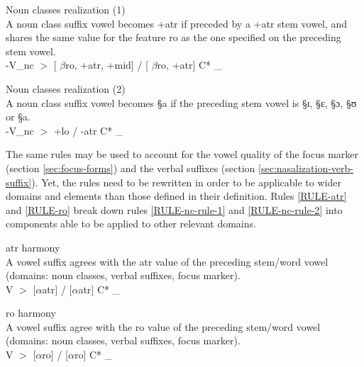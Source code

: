 \begin{Rule}\label{RULE-nc-rule-1}{Noun classes realization (1)}\\
A noun class suffix vowel becomes {\sc +atr} if preceded by a {\sc +atr}
stem vowel, and shares the same value for the
feature {\sc ro}  as the one specified on the preceding stem vowel. \\
-V_{nc} $>$ [ $\beta${\sc ro},  {\sc +atr}, {\sc +mid}]  / [ $\beta${\sc ro},
{\sc +atr}] C* \_

\end{Rule}


\begin{Rule}\label{RULE-nc-rule-2}{Noun classes realization (2)}\\
A noun class suffix vowel becomes {\S a} if the preceding stem vowel is 
{\S ɪ},
{\S ɛ}, {\S ɔ}, {\S ʊ} or {\S a}.\\
-V_{nc} $>$ {\sc +lo}  / {\sc -atr} C* \_ 
\end{Rule}


The same rules may be used to account for the vowel
quality of the focus marker (section \ref{sec:focus-forms}) and  the verbal
suffixes (section \ref{sec:nasalization-verb-suffix}). Yet, the rules need to
be rewritten in order to be  applicable to wider domains and elements than
those defined in their definition. Rules \ref{RULE-atr} and \ref{RULE-ro} break
down rules \ref{RULE-nc-rule-1} and \ref{RULE-nc-rule-2} into components able to
be applied to other relevant domains.



\begin{Rule}\label{RULE-atr}{{\sc atr} harmony}\\
A vowel suffix agrees with the {\sc atr} value of   the preceding stem/word 
vowel (domains: noun classes, verbal suffixes, focus marker).\\
V $>$ $[\alpha${\sc atr}$]$  / $[\alpha${\sc atr}$]$ C* \_
\end{Rule}


\begin{Rule}\label{RULE-ro}{{\sc ro} harmony}\\
A vowel suffix  agree with the {\sc ro} value of  the   preceding stem/word
 vowel (domains: noun classes, verbal suffixes, focus marker).\\
V $>$ [$\alpha${\sc ro}]  / [$\alpha${\sc ro}] C* \_
\end{Rule}

